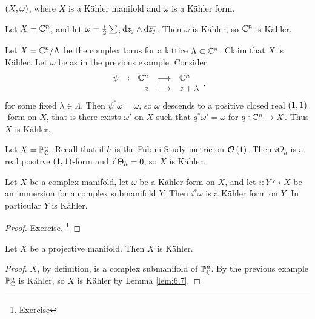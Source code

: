 \begin{notation*}
$ \br{X, \omega} $, where $ X $ is a K\"ahler manifold and $ \omega $ is a K\"ahler form.
\end{notation*}

\begin{example}
Let $ X = \mathbb{C}^n $, and let $ \omega = \tfrac{i}{2}\sum_j \mathrm{d} z_j \wedge \mathrm{d}\overline{z_j} $. Then $ \omega $ is K\"ahler, so $ \mathbb{C}^n $ is K\"ahler.
\end{example}

\begin{example}
Let $ X = \mathbb{C}^n / \Lambda $ be the complex torus for a lattice $ \Lambda \subset \mathbb{C}^n $. Claim that $ X $ is K\"ahler. Let $ \omega $ be as in the previous example. Consider
$$ \function[\psi]{\CC^n}{\CC^n}{z}{z + \lambda}, $$
for some fixed $ \lambda \in \Lambda $. Then $ \psi^*\omega = \omega $, so $ \omega $ descends to a positive closed real $ \br{1, 1} $-form on $ X $, that is there exists $ \omega' $ on $ X $ such that $ q^*\omega' = \omega $ for $ q : \mathbb{C}^n \to X $. Thus $ X $ is K\"ahler.
\end{example}

\begin{example}
Let $ X = \mathbb{P}_{\mathbb{C}}^n $. Recall that if $ h $ is the Fubini-Study metric on $ \OOO\br{1} $. Then $ i\Theta_h $ is a real positive $ \br{1, 1} $-form and $ \mathrm{d}\Theta_h = 0 $, so $ X $ is K\"ahler.
\end{example}

\begin{lemma}
\label{lem:6.7}
Let $ X $ be a complex manifold, let $ \omega $ be a K\"ahler form on $ X $, and let $ i : Y \hookrightarrow X $ be an immersion for a complex submanifold $ Y $. Then $ i^*\omega $ is a K\"ahler form on $ Y $. In particular $ Y $ is K\"ahler.
\end{lemma}

\begin{proof}
Exercise. \footnote{Exercise}
\end{proof}

\begin{corollary}
Let $ X $ be a projective manifold. Then $ X $ is K\"ahler.
\end{corollary}

\begin{proof}
$ X $, by definition, is a complex submanifold of $ \mathbb{P}_{\mathbb{C}}^n $. By the previous example $ \mathbb{P}_{\mathbb{C}}^n $ is K\"ahler, so $ X $ is K\"ahler by Lemma \ref{lem:6.7}.
\end{proof}

